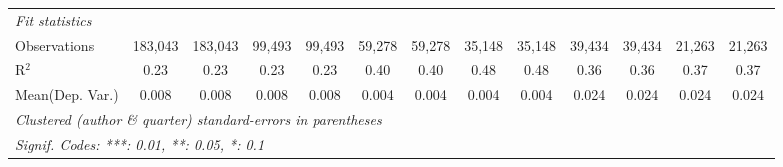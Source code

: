 \begin{tabular}{lcccccccccccc}
   \midrule
   \emph{Fit statistics}\\
   Observations                             & 183,043       & 183,043       & 99,493        & 99,493        & 59,278         & 59,278        & 35,148         & 35,148        & 39,434        & 39,434   & 21,263         & 21,263\\  
   R$^2$                                    & 0.23          & 0.23          & 0.23          & 0.23          & 0.40           & 0.40          & 0.48           & 0.48          & 0.36          & 0.36     & 0.37           & 0.37\\  
Mean(Dep. Var.) & 0.008 & 0.008 & 0.008 & 0.008 & 0.004 & 0.004 & 0.004 & 0.004 & 0.024 & 0.024 & 0.024 & 0.024 \\
   \midrule \midrule
   \multicolumn{13}{l}{\emph{Clustered (author \& quarter) standard-errors in parentheses}}\\
   \multicolumn{13}{l}{\emph{Signif. Codes: ***: 0.01, **: 0.05, *: 0.1}}\\
\end{tabular}
\par\endgroup
